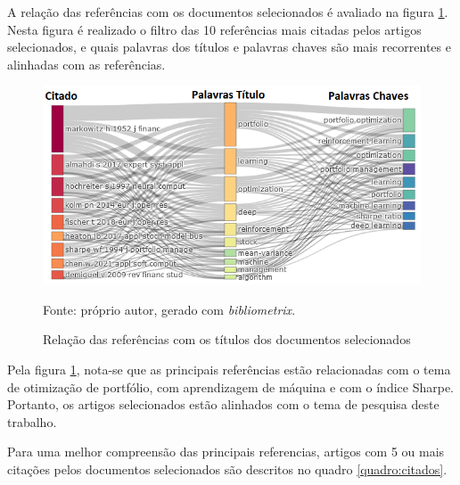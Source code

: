        \ipar A relação das referências com os documentos selecionados é avaliado na figura \ref{fig:tree_field_plot}. Nesta figura é realizado o filtro das 10 referências mais citadas pelos artigos selecionados, e quais palavras dos títulos e palavras chaves são mais recorrentes e alinhadas com as referências.

        \begin{figure}[H]
            \centering
            \caption{Relação das referências com os títulos dos documentos selecionados}
            \label{fig:tree_field_plot}
            \includegraphics[width=.8\textwidth]{./imagens/tree_field_plot.png}
            \par \footnotesize Fonte: próprio autor, gerado com \textit{bibliometrix}.
        \end{figure}

        \ipar Pela figura \ref{fig:tree_field_plot}, nota-se que as principais referências estão relacionadas com o tema de otimização de portfólio, com aprendizagem de máquina e com o índice Sharpe. Portanto, os artigos selecionados estão alinhados com o tema de pesquisa deste trabalho.

        \ipar Para uma melhor compreensão das principais referencias, artigos com 5 ou mais citações pelos documentos selecionados são descritos no quadro \ref{quadro:citados}.


